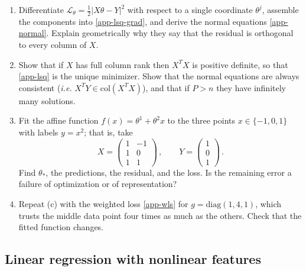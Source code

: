 \documentclass[11pt]{article}
\newcommand{\CL}{{\mathcal L}}
\begin{document}
\begin{exercise}
\label{ex:app-lsq}
\begin{enumerate}
  \item Differentiate $\CL_\theta = \frac{1}{2}|X\theta-Y|^2$ with respect to a single coordinate $\theta^j$, assemble the components into \eqref{app-lsq-grad}, and derive the normal equations \eqref{app-normal}. Explain geometrically why they say that the residual is orthogonal to every column of $X$.
  \item\label{ex:app-lsq-posdef} Show that if $X$ has full column rank then $X^TX$ is positive definite, so that \eqref{app-lsq} is the unique minimizer. Show that the normal equations are always consistent (\emph{i.e.} $X^TY\in\mathrm{col}(X^TX)$), and that if $P>n$ they have infinitely many solutions.
  \item\label{ex:app-lsq-affine} Fit the affine function $f(x) = \theta^1 + \theta^2 x$ to the three points $x\in\{-1,0,1\}$ with labels $y=x^2$; that is, take
%
\begin{equation*}
    X = \begin{pmatrix} 1 & -1 \\ 1 & 0 \\ 1 & 1\end{pmatrix}\,,\qquad Y = \begin{pmatrix} 1 \\ 0 \\ 1\end{pmatrix}\,.
\end{equation*}
%
Find $\theta_*$, the predictions, the residual, and the loss. Is the remaining error a failure of optimization or of representation?
  \item\label{ex:app-lsq-weighted} Repeat (c) with the weighted loss \eqref{app-wls} for $g = \mathrm{diag}(1,4,1)$, which trusts the middle data point four times as much as the others. Check that the fitted function changes.
\end{enumerate}
\end{exercise}

\subsection{Linear regression with nonlinear features}
\label{app:features}
\end{document}
